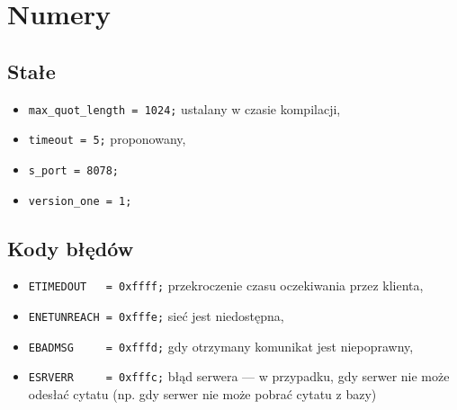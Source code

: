 \documentclass{article}
\begin{document}
\section{Numery}
\subsection{Stałe}
\begin{itemize}
\item \verb+max_quot_length = 1024;+ ustalany w czasie kompilacji,
\item \verb+timeout = 5;+ proponowany,
\item \verb+s_port = 8078;+
\item \verb+version_one = 1;+
\end{itemize}
\subsection{Kody błędów}
\begin{itemize}
\item \verb+ETIMEDOUT   = 0xffff;+ przekroczenie czasu oczekiwania przez klienta,
\item \verb+ENETUNREACH = 0xfffe;+ sieć jest niedostępna,
\item \verb+EBADMSG     = 0xfffd;+ gdy otrzymany komunikat jest niepoprawny,
\item \verb+ESRVERR     = 0xfffc;+ błąd serwera --- w przypadku, gdy serwer 
        nie może odesłać cytatu (np. gdy serwer nie może pobrać cytatu z bazy)
\end{itemize}
\end{document}
